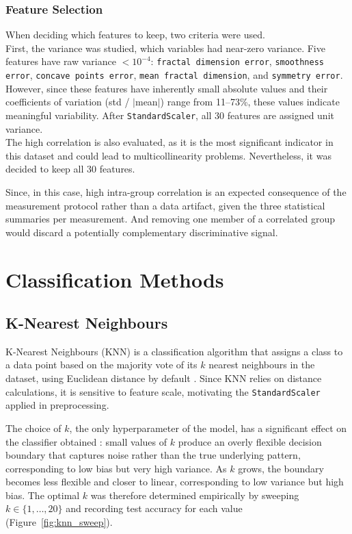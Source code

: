 \documentclass[twocolumn, fontsize=10pt]{article}
\begin{document}
\subsubsection{Feature Selection}
When deciding which features to keep, two criteria were used.\\
First, the variance was studied, which variables had near-zero variance. Five features have raw variance $< 10^{-4}$: \texttt{fractal dimension error}, \texttt{smoothness error}, \texttt{concave points error}, \texttt{mean fractal dimension}, and \texttt{symmetry error}. However, since these features have inherently small absolute values and their coefficients of variation (std / $|$mean$|$) range from 11--73\%, these values indicate meaningful variability. After \texttt{StandardScaler}, all 30 features are assigned unit variance.\\

The high correlation is also evaluated, as it is the most significant indicator in this dataset and could lead to multicollinearity problems.
Nevertheless, it was decided to keep all 30 features.

Since, in this case, high intra-group correlation is an expected consequence of the measurement protocol rather than a data artifact, given the three statistical summaries per measurement. And removing one member of a correlated group would discard a potentially complementary discriminative  signal.


\section{Classification Methods}
\label{sec:methods_class}


\subsection{K-Nearest Neighbours}
\label{sec:knn}

K-Nearest Neighbours (KNN) is a classification algorithm that assigns a 
class to a data point based on the majority vote of its $k$ nearest 
neighbours in the dataset, using Euclidean distance by default 
\citep{hastie2009elements}. Since KNN relies on distance calculations, 
it is sensitive to feature scale, motivating the \texttt{StandardScaler} 
applied in preprocessing.

The choice of $k$, the only hyperparameter of the model, has a significant 
effect on the classifier obtained \citep{james2021statistical}: small 
values of $k$ produce an overly flexible decision boundary that captures 
noise rather than the true underlying pattern, corresponding to low bias 
but very high variance. As $k$ grows, the boundary becomes less flexible 
and closer to linear, corresponding to low variance but high bias. The 
optimal $k$ was therefore determined empirically by sweeping 
$k \in \{1, \ldots, 20\}$ and recording test accuracy for each value 
(Figure~\ref{fig:knn_sweep}).
\end{document}
